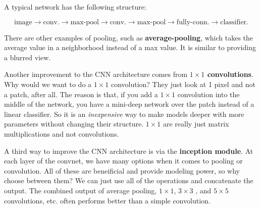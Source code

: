 A typical network has the following structure: 

\begin{equation}
	\text{image} \rightarrow \text{conv.} \rightarrow \text{max-pool} \rightarrow \text{conv.} \rightarrow \text{max-pool} \rightarrow \text{fully-conn.} \rightarrow \text{classifier}.
\end{equation}

There are other examples of pooling, such as \textbf{average-pooling}, which takes the average value in a neighborhood instead of a max value. It is similar to providing a blurred view. 

Another improvement to the CNN architecture comes from \textbf{$1\times1$ convolutions}. Why would we want to do a $1\times1$ convolution? They just look at 1 pixel and not a patch, after all. The reason is that, if you add a $1\times1$ convolution into the middle of the network, you have a mini-deep network over the patch instead of a linear classifier. So it is an \textit{inexpensive} way to make models deeper with more parameters without changing their structure. $1\times1$ are really just matrix multiplications and not convolutions. 

A third way to improve the CNN architecture is via the \textbf{inception module}. At each layer of the convnet, we have many options when it comes to pooling or convolution. All of these are beneificial and provide modeling power, so why choose between them? We can just use all of the operations and concatenate the output. The combined output of average pooling, $1\times1$, $3\times3$ , and $5\times5$ convolutions, etc. often performs better than a simple convolution.


